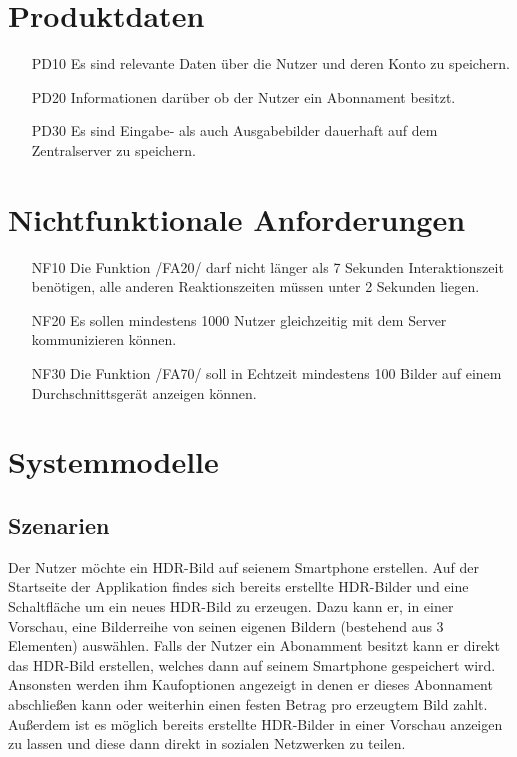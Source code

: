 \documentclass[parskip=full]{scrartcl}
\begin{document}
\section{Produktdaten}
\begin{itemize}[nosep]
\item[PD10] Es sind relevante Daten über die \gls{Nutzer} und deren Konto zu speichern.
\item[PD20] Informationen darüber ob der Nutzer ein Abonnament besitzt.
\item[PD30] Es sind Eingabe- als auch Ausgabebilder dauerhaft auf dem Zentralserver zu speichern.
\end{itemize}

\section{Nichtfunktionale Anforderungen}
\begin{itemize}[nosep]
\item[NF10] Die Funktion /FA20/ darf nicht länger als 7 Sekunden Interaktionszeit benötigen, alle anderen Reaktionszeiten müssen unter 2 Sekunden liegen.
\item[NF20] Es sollen mindestens 1000 Nutzer gleichzeitig mit dem Server kommunizieren können.
\item[NF30] Die Funktion /FA70/ soll in Echtzeit mindestens 100 Bilder auf einem Durchschnittsgerät anzeigen können.
\end{itemize}

\section{Systemmodelle}

\subsection{Szenarien}
Der Nutzer möchte ein HDR-Bild auf seienem Smartphone erstellen. Auf der Startseite der Applikation findes sich bereits erstellte HDR-Bilder und eine Schaltfläche um ein neues HDR-Bild zu erzeugen. Dazu kann er, in einer Vorschau, eine Bilderreihe von seinen eigenen Bildern (bestehend aus 3 Elementen) auswählen. Falls der Nutzer ein Abonamment besitzt kann er direkt das HDR-Bild erstellen, welches dann auf seinem Smartphone gespeichert wird. Ansonsten werden ihm Kaufoptionen angezeigt in denen er dieses Abonnament abschließen kann oder weiterhin einen festen Betrag pro erzeugtem Bild zahlt. Außerdem ist es möglich bereits erstellte HDR-Bilder in einer Vorschau anzeigen zu lassen und diese dann direkt in sozialen Netzwerken zu teilen.
\end{document}

